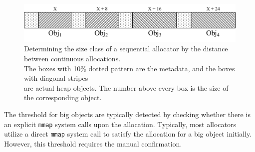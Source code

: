 \begin{figure}[!ht]
\centering
\includegraphics[width=5in]{figures/sequentialclasssize}
\caption{Determining the size class of a sequential allocator by the distance between continuous allocations. \\The boxes with 10\% dotted pattern are the metadata, and the boxes with diagonal stripes\\ are actual heap objects. The number above every box is the size of the corresponding object. \label{fig:sizeclass}}
\end{figure}


The threshold for big objects are typically detected by checking whether there is an explicit \texttt{mmap} system calls upon the allocation. Typically, most allocators utilize a direct \texttt{mmap} system call to satisfy the allocation for a big object initially. However, this threshold requires the manual confirmation. 

